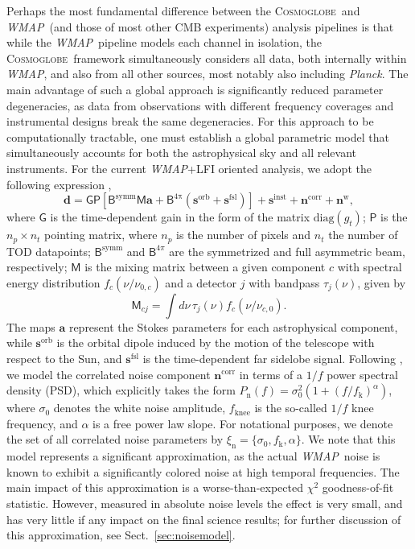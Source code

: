 \documentclass[twocolumn]{../../common/aa}
\def\WMAP{\emph{WMAP}}
\def\Planck{\emph{Planck}}
\newcommand{\cosmoglobe}{\textsc{Cosmoglobe}}
\begin{document}
Perhaps the most fundamental difference between the \cosmoglobe\ and \WMAP\ (and those of most other CMB experiments) analysis pipelines is that while the \WMAP\ pipeline models each channel in isolation, the \cosmoglobe\ framework simultaneously considers all data, both internally within \WMAP, and also from all other sources, most notably also including \Planck. The main advantage of such a global approach is significantly reduced parameter degeneracies, as data from observations with different frequency coverages and instrumental designs break the same degeneracies. For this approach to be computationally tractable, one must establish a global parametric model that simultaneously accounts for both the astrophysical sky and all relevant instruments. For the current \WMAP+LFI oriented analysis, we adopt the following expression \citep{bp01},
\begin{equation}
	\label{eq:model}
	\boldsymbol d =\mathsf G\mathsf P[\mathsf B^\mathrm{symm}\mathsf M\boldsymbol a+\mathsf B^\mathrm{4\pi}(\boldsymbol s^\mathrm{orb}
	+\boldsymbol s^\mathrm{fsl})] + \boldsymbol s^\mathrm{inst}+ \boldsymbol n^\mathrm{corr}+\boldsymbol n^\mathrm w,
\end{equation}
where $\mathsf G$ is the time-dependent gain in the form of the matrix $\mathrm{diag}(g_t)$; $\mathsf P$ is the $n_p\times n_t$ pointing matrix, where $n_p$ is the number of pixels and $n_t$ the number of TOD datapoints;
$\mathsf B^\mathrm{symm}$ and $\mathsf B^{4\pi}$ are the symmetrized and full asymmetric beam, respectively; $\mathsf M$ is the mixing matrix between a given component $c$ with spectral energy distribution $f_c(\nu/\nu_{0,c})$ and a detector $j$ with bandpass $\tau_j(\nu)$, given by
\begin{equation}
	\mathsf M_{cj}=\int d\nu\,\tau_j(\nu)f_c(\nu/\nu_{c,0}).
\end{equation}
The maps $\boldsymbol a$ represent the Stokes parameters for each astrophysical component, while $\boldsymbol s^\mathrm{orb}$ is the orbital dipole induced by the motion of the telescope with respect to the Sun, and $\boldsymbol s^\mathrm{fsl}$ is the time-dependent far sidelobe signal. Following \citet{bp06}, we model the correlated noise component $\boldsymbol n^\mathrm{corr}$ in terms of a $1/f$ power spectral density (PSD), which explicitly takes the form $P_\mathrm{n}(f) = \sigma^2_0 (1 + (f/f_\mathrm{k})^\alpha)$, where $\sigma_0$ denotes the white noise amplitude, $f_\mathrm{knee}$ is the so-called $1/f$ knee frequency, and $\alpha$ is a free power law slope. For notational purposes, we denote the set of all correlated noise parameters by $\xi_{\mathrm{n}} = \{\sigma_0, f_{\mathrm{k}}, \alpha\}$. We note that this model represents a significant approximation, as the actual \WMAP\ noise is known to exhibit a significantly colored noise at high temporal frequencies. The main impact of this approximation is a worse-than-expected $\chi^2$ goodness-of-fit statistic. However, measured in absolute noise levels the effect is very small, and has very little if any impact on the final science results; for further discussion of this approximation, see Sect.~\ref{sec:noisemodel}. 
\end{document}
